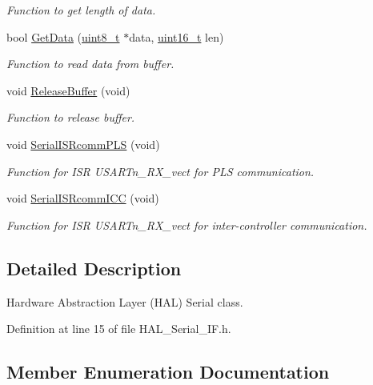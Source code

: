 \begin{DoxyCompactItemize}
\begin{DoxyCompactList}\small\item\em Function to get length of data. \end{DoxyCompactList}\item 
bool \mbox{\hyperlink{class_c_serial_abad86c07f530569b2ceeea75bda485ad}{Get\+Data}} (\mbox{\hyperlink{_a_d_a_s___types_8h_aba7bc1797add20fe3efdf37ced1182c5}{uint8\+\_\+t}} $\ast$data, \mbox{\hyperlink{_a_d_a_s___types_8h_a1f1825b69244eb3ad2c7165ddc99c956}{uint16\+\_\+t}} len)
\begin{DoxyCompactList}\small\item\em Function to read data from buffer. \end{DoxyCompactList}\item 
void \mbox{\hyperlink{class_c_serial_a941e5cae2ca04518925a3b32f51110a6}{Release\+Buffer}} (void)
\begin{DoxyCompactList}\small\item\em Function to release buffer. \end{DoxyCompactList}\item 
void \mbox{\hyperlink{class_c_serial_a707841754d94fc1ab6679f52bf413d85}{Serial\+I\+S\+Rcomm\+P\+LS}} (void)
\begin{DoxyCompactList}\small\item\em Function for I\+SR U\+S\+A\+R\+Tn\+\_\+\+R\+X\+\_\+vect for P\+LS communication. \end{DoxyCompactList}\item 
void \mbox{\hyperlink{class_c_serial_a974812db5ced18cb9a6a73dc9034e7c8}{Serial\+I\+S\+Rcomm\+I\+CC}} (void)
\begin{DoxyCompactList}\small\item\em Function for I\+SR U\+S\+A\+R\+Tn\+\_\+\+R\+X\+\_\+vect for inter-\/controller communication. \end{DoxyCompactList}\end{DoxyCompactItemize}


\subsection{Detailed Description}
Hardware Abstraction Layer (H\+AL) Serial class. 

Definition at line 15 of file H\+A\+L\+\_\+\+Serial\+\_\+\+I\+F.\+h.



\subsection{Member Enumeration Documentation}
\mbox{\label{class_c_serial_a000039540cc90b18bafacf5744e7eda2}} 
